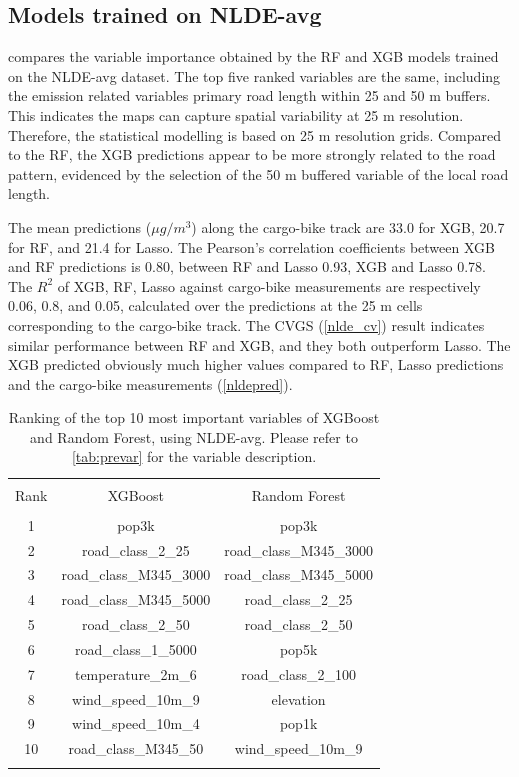 \documentclass{article}
\begin{document}
\subsection{Models trained on NLDE-avg}

 compares the variable importance obtained by the RF and XGB models trained on the NLDE-avg dataset. The top five ranked variables are the same, including the emission related variables primary road length within 25 and 50 m buffers. This indicates the maps can capture spatial variability at 25 m resolution. Therefore, the statistical modelling is based on 25 m resolution grids. Compared to the RF, the XGB predictions appear to be more strongly related to the road pattern, evidenced by the selection of the 50 m buffered variable of the local road length. 

The mean predictions ($\mu g/m^3$) along the cargo-bike track are 33.0 for XGB, 20.7 for RF, and 21.4 for Lasso. The Pearson's correlation coefficients between XGB and RF predictions is 0.80, between RF and Lasso 0.93, XGB and Lasso 0.78. The $R^2$ of XGB, RF, Lasso against cargo-bike measurements are respectively 0.06, 0.8, and 0.05, calculated over the predictions at the 25 m cells corresponding to the cargo-bike track. The CVGS (\cref{nlde_cv}) result indicates similar performance between RF and XGB, and they both outperform Lasso. The XGB predicted obviously much higher values compared to RF, Lasso predictions and the cargo-bike measurements (\cref{nldepred}). 
 
\begin{table}[H] \centering 
  \caption{Ranking of the top 10 most important variables of XGBoost and Random Forest, using NLDE-avg. Please refer to  \cref{tab:prevar} for the variable description.} 
    \label{nlde_vimp} 
\begin{tabular}{@{\extracolsep{5pt}} ccc} 
\\[-1.8ex]\hline 
\hline \\[-1.8ex] 
Rank & XGBoost & Random Forest \\ 
\hline \\[-1.8ex] 
1 & pop3k & pop3k \\ 
2 & road\_class\_2\_25 & road\_class\_M345\_3000 \\ 
3 & road\_class\_M345\_3000 & road\_class\_M345\_5000 \\ 
4 & road\_class\_M345\_5000 & road\_class\_2\_25 \\ 
5 & road\_class\_2\_50 & road\_class\_2\_50 \\ 
6 & road\_class\_1\_5000 & pop5k \\ 
7 & temperature\_2m\_6 & road\_class\_2\_100 \\ 
8 & wind\_speed\_10m\_9 & elevation \\ 
9 & wind\_speed\_10m\_4 & pop1k \\ 
10 & road\_class\_M345\_50 & wind\_speed\_10m\_9 \\ 
 
\hline \\[-1.8ex] 
\end{tabular} 
\end{table} 
\end{document}
